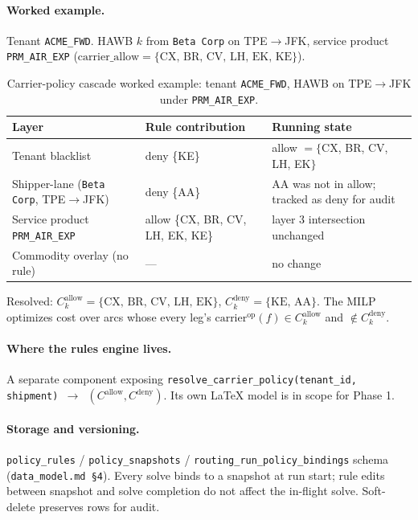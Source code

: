 \documentclass[11pt,a4paper]{article}
\theoremstyle{definition}
\begin{document}
\paragraph{Worked example.}
Tenant \texttt{ACME\_FWD}. HAWB $k$ from \texttt{Beta Corp} on TPE$\to$JFK,
service product \texttt{PRM\_AIR\_EXP} ($\text{carrier\_allow} = \{\text{CX, BR,
CV, LH, EK, KE}\}$).
\begin{table}[H]
\centering
\caption{Carrier-policy cascade worked example: tenant \texttt{ACME\_FWD}, HAWB on TPE$\to$JFK under \texttt{PRM\_AIR\_EXP}.}
\label{tab:carrier-policy-worked-example}
\begin{tabular}{p{3.2cm}p{4.5cm}p{6.5cm}}
\toprule
Layer & Rule contribution & Running state \\
\midrule
Tenant blacklist & deny \{KE\} & allow $= \{$CX, BR, CV, LH, EK$\}$ \\
Shipper-lane (\texttt{Beta Corp}, TPE$\to$JFK) & deny \{AA\} & AA was not in allow; tracked as deny for audit \\
Service product \texttt{PRM\_AIR\_EXP} & allow \{CX, BR, CV, LH, EK, KE\} & layer 3 intersection unchanged \\
Commodity overlay (no rule) & --- & no change \\
\bottomrule
\end{tabular}
\end{table}
Resolved: $C_k^{\text{allow}} = \{\text{CX, BR, CV, LH, EK}\}$,
$C_k^{\text{deny}} = \{\text{KE, AA}\}$. The MILP optimizes cost over
arcs whose every leg's $\text{carrier}^{\text{op}}(f) \in C_k^{\text{allow}}$
and $\notin C_k^{\text{deny}}$.

\paragraph{Where the rules engine lives.}
A separate component exposing
\texttt{resolve\_carrier\_policy(tenant\_id, shipment) $\to$
$(C^{\text{allow}}, C^{\text{deny}})$}. Its own LaTeX model
is in scope for Phase 1.

\paragraph{Storage and versioning.}
\texttt{policy\_rules} / \texttt{policy\_snapshots} /
\texttt{routing\_run\_policy\_bindings} schema
(\texttt{data\_model.md \S4}). Every solve binds to a snapshot at run start;
rule edits between snapshot and solve completion do not affect the in-flight
solve. Soft-delete preserves rows for audit.
\end{document}
